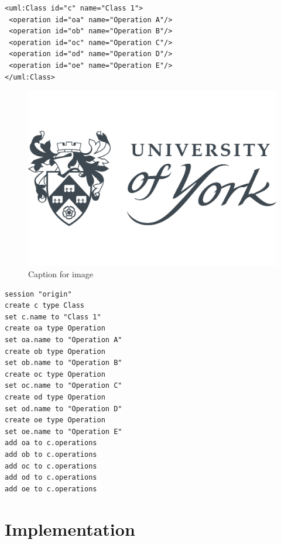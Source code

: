 \documentclass{llncs}
\begin{document}
\begin{minipage}[t]{0.59\linewidth}    
\begin{lstlisting}[style=eol,caption={The XMI of the model in Fig. \ref{fig:example_model}.},label=lst:originxmi]
<uml:Class id="c" name="Class 1">
 <operation id="oa" name="Operation A"/>
 <operation id="ob" name="Operation B"/>
 <operation id="oc" name="Operation C"/>
 <operation id="od" name="Operation D"/>
 <operation id="oe" name="Operation E"/>
</uml:Class>
\end{lstlisting}
\vspace{-30pt}
\begin{figure}[H]
\includegraphics[width=\linewidth]{images/uoy}
\caption{Caption for image}
\label{fig:example_model}
\end{figure}
\end{minipage}
\hfill
\begin{minipage}[t]{0.39\linewidth}
\begin{lstlisting}[style=eol,caption={The textual CBP of the model in Fig. \ref{fig:example_model}.},label=lst:origincbp]
session "origin"
create c type Class
set c.name to "Class 1" 
create oa type Operation
set oa.name to "Operation A" 
create ob type Operation
set ob.name to "Operation B" 
create oc type Operation
set oc.name to "Operation C" 
create od type Operation
set od.name to "Operation D" 
create oe type Operation
set oe.name to "Operation E" 
add oa to c.operations
add ob to c.operations
add oc to c.operations
add od to c.operations
add oe to c.operations
\end{lstlisting}
\end{minipage}

\section{Implementation}
\label{sec:implementation}
\end{document}
